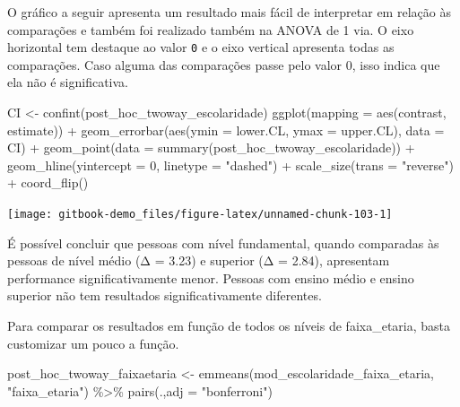 \documentclass[
]{book}
\newenvironment{Shaded}{\begin{snugshade}}{\end{snugshade}}
\newcommand{\AttributeTok}[1]{\textcolor[rgb]{0.77,0.63,0.00}{#1}}
\newcommand{\DecValTok}[1]{\textcolor[rgb]{0.00,0.00,0.81}{#1}}
\newcommand{\FunctionTok}[1]{\textcolor[rgb]{0.00,0.00,0.00}{#1}}
\newcommand{\NormalTok}[1]{#1}
\newcommand{\OtherTok}[1]{\textcolor[rgb]{0.56,0.35,0.01}{#1}}
\newcommand{\SpecialCharTok}[1]{\textcolor[rgb]{0.00,0.00,0.00}{#1}}
\newcommand{\StringTok}[1]{\textcolor[rgb]{0.31,0.60,0.02}{#1}}
\begin{document}
O gráfico a seguir apresenta um resultado mais fácil de interpretar em relação às comparações e também foi realizado também na ANOVA de 1 via. O eixo horizontal tem destaque ao valor \texttt{0} e o eixo vertical apresenta todas as comparações. Caso alguma das comparações passe pelo valor 0, isso indica que ela não é significativa.

\begin{Shaded}
\begin{Highlighting}[]
\NormalTok{CI }\OtherTok{\textless{}{-}} \FunctionTok{confint}\NormalTok{(post\_hoc\_twoway\_escolaridade)}
\FunctionTok{ggplot}\NormalTok{(}\AttributeTok{mapping =} \FunctionTok{aes}\NormalTok{(contrast, estimate)) }\SpecialCharTok{+}
  \FunctionTok{geom\_errorbar}\NormalTok{(}\FunctionTok{aes}\NormalTok{(}\AttributeTok{ymin =}\NormalTok{ lower.CL, }\AttributeTok{ymax =}\NormalTok{ upper.CL), }\AttributeTok{data =}\NormalTok{ CI) }\SpecialCharTok{+}
  \FunctionTok{geom\_point}\NormalTok{(}\AttributeTok{data =} \FunctionTok{summary}\NormalTok{(post\_hoc\_twoway\_escolaridade)) }\SpecialCharTok{+}
  \FunctionTok{geom\_hline}\NormalTok{(}\AttributeTok{yintercept =} \DecValTok{0}\NormalTok{, }\AttributeTok{linetype =} \StringTok{"dashed"}\NormalTok{) }\SpecialCharTok{+} 
  \FunctionTok{scale\_size}\NormalTok{(}\AttributeTok{trans =} \StringTok{"reverse"}\NormalTok{) }\SpecialCharTok{+} 
  \FunctionTok{coord\_flip}\NormalTok{()}
\end{Highlighting}
\end{Shaded}

\begin{center}\texttt{[image: gitbook-demo\_files/figure-latex/unnamed-chunk-103-1]} \end{center}

É possível concluir que pessoas com nível fundamental, quando comparadas às pessoas de nível médio (Δ = 3.23) e superior (Δ = 2.84), apresentam performance significativamente menor. Pessoas com ensino médio e ensino superior não tem resultados significativamente diferentes.

Para comparar os resultados em função de todos os níveis de faixa\_etaria, basta customizar um pouco a função.

\begin{Shaded}
\begin{Highlighting}[]
\NormalTok{post\_hoc\_twoway\_faixaetaria }\OtherTok{\textless{}{-}} \FunctionTok{emmeans}\NormalTok{(mod\_escolaridade\_faixa\_etaria, }
                                       \StringTok{"faixa\_etaria"}\NormalTok{) }\SpecialCharTok{\%\textgreater{}\%} 
  \FunctionTok{pairs}\NormalTok{(.,}\AttributeTok{adj =} \StringTok{"bonferroni"}\NormalTok{)}
\end{Highlighting}
\end{Shaded}
\end{document}
